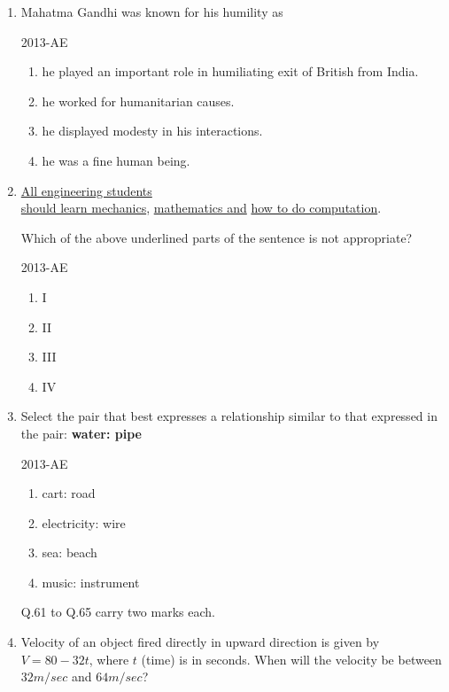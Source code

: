 \documentclass[journal]{IEEEtran}
\newcommand{\questionref}[1]{{ #1}}
\begin{document}
\begin{enumerate}
\item \label{Q.58} Mahatma Gandhi was known for his humility as

\hfill{2013-AE}

\begin{enumerate}
    \item he played an important role in humiliating exit of British from India.
    \item he worked for humanitarian causes.
    \item he displayed modesty in his interactions.
    \item he was a fine human being.\\
\end{enumerate}

\item \label{Q.59} \underline{All engineering students} \\ \underline{should learn mechanics}, \underline{mathematics and}  \underline{how to do computation}.

Which of the above underlined parts of the sentence is not appropriate?

\hfill{2013-AE}

\begin{enumerate}
    \item I
    \item II
    \item III
    \item IV\\
\end{enumerate}

\item \label{Q.60} Select the pair that best expresses a relationship similar to that expressed in the pair: \textbf{water: pipe}

\hfill{2013-AE}

\begin{enumerate}
    \item cart: road
    \item electricity: wire
    \item sea: beach
    \item music: instrument\\
\end{enumerate}

\questionref{Q.61} to \questionref{Q.65} carry two marks each.\\

\item \label{Q.61} Velocity of an object fired directly in upward direction is given by $V = 80 - 32t$, where $t$ (time) is in seconds. When will the velocity be between $32 m/sec$ and $64 m/sec$?


\end{enumerate}
\end{document}
